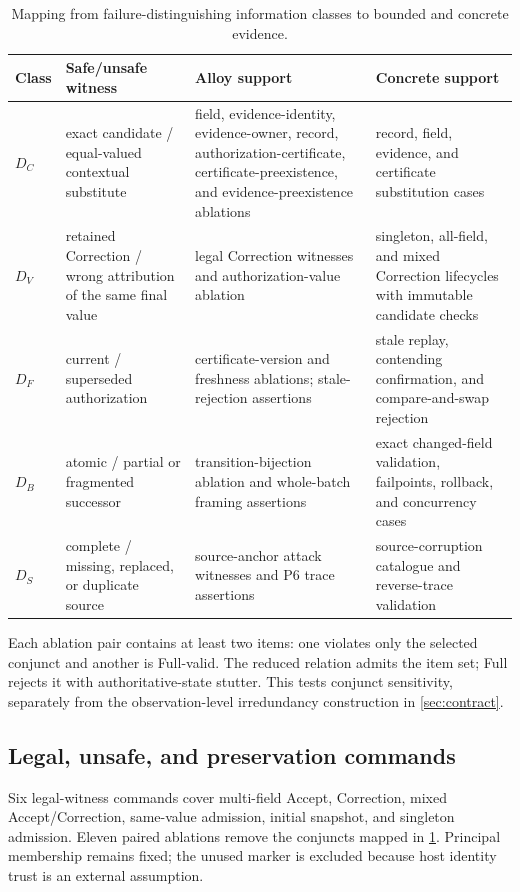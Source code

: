 \begin{table}[t]
\centering
\footnotesize
\caption{Mapping from failure-distinguishing information classes to bounded and concrete evidence.}
\label{tab:distinction-evidence}
\begin{tabularx}{\textwidth}{@{}l>{\raggedright\arraybackslash}p{}>{\raggedright\arraybackslash}p{}>{\raggedright\arraybackslash}X@{}}
\toprule
Class & Safe/unsafe witness & Alloy support & Concrete support \\
\midrule
$D_C$ & exact candidate / equal-valued contextual substitute & field, evidence-identity, evidence-owner, record, authorization-certificate, certificate-preexistence, and evidence-preexistence ablations & record, field, evidence, and certificate substitution cases \\
$D_V$ & retained Correction / wrong attribution of the same final value & legal Correction witnesses and authorization-value ablation & singleton, all-field, and mixed Correction lifecycles with immutable candidate checks \\
$D_F$ & current / superseded authorization & certificate-version and freshness ablations; stale-rejection assertions & stale replay, contending confirmation, and compare-and-swap rejection \\
$D_B$ & atomic / partial or fragmented successor & transition-bijection ablation and whole-batch framing assertions & exact changed-field validation, failpoints, rollback, and concurrency cases \\
$D_S$ & complete / missing, replaced, or duplicate source & source-anchor attack witnesses and P6 trace assertions & source-corruption catalogue and reverse-trace validation \\
\bottomrule
\end{tabularx}
\end{table}

Each ablation pair contains at least two items: one violates only the selected conjunct and another is Full-valid. The reduced relation admits the item set; Full rejects it with authoritative-state stutter. This tests conjunct sensitivity, separately from the observation-level irredundancy construction in \cref{sec:contract}.

\subsection{Legal, unsafe, and preservation commands}

Six legal-witness commands cover multi-field Accept, Correction, mixed Accept/Correction, same-value admission, initial snapshot, and singleton admission. Eleven paired ablations remove the conjuncts mapped in \cref{tab:distinction-evidence}. Principal membership remains fixed; the unused  marker is excluded because host identity trust is an external assumption.

